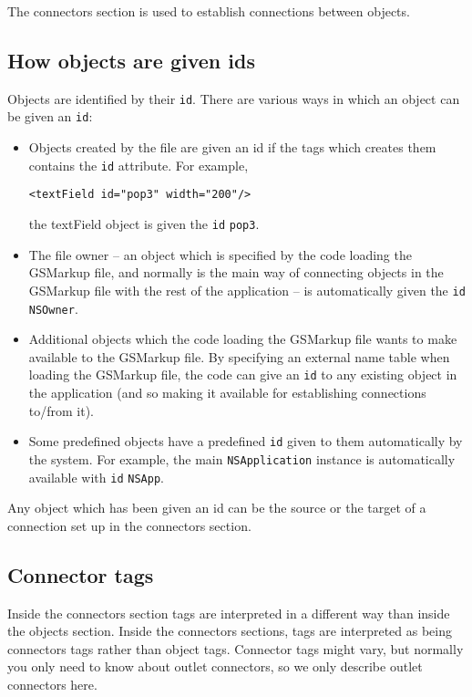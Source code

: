 The connectors section is used to establish connections between
objects.

\subsection{How objects are given ids}
Objects are identified by their \texttt{id}.  There are various ways
in which an object can be given an \texttt{id}:
\begin{itemize}
\item Objects created by the file are given an id if the tags which creates
them contains the \texttt{id} attribute.  For example,
\begin{verbatim}
<textField id="pop3" width="200"/>
\end{verbatim}
the textField object is given the \texttt{id} \texttt{pop3}.
\item The file owner -- an object which is specified by the code loading the
GSMarkup file, and normally is the main way of connecting objects in the
GSMarkup file with the rest of the application -- is automatically given
the \texttt{id} \texttt{NSOwner}.
\item Additional objects which the code loading the GSMarkup file wants to make
available to the GSMarkup file.  By specifying an external name table when
loading the GSMarkup file, the code can give an \texttt{id} to any
existing object in the application (and so making it available for
establishing connections to/from it).
\item Some predefined objects have a predefined \texttt{id} given to them
automatically by the system.  For example, the main
\texttt{NSApplication} instance is automatically available with \texttt{id}
\texttt{NSApp}.
\end{itemize}
Any object which has been given an id can be the source or the target
of a connection set up in the connectors section.

\subsection{Connector tags}
Inside the connectors section tags are interpreted in a different way
than inside the objects section.  Inside the connectors sections, tags
are interpreted as being connectors tags rather than object tags.
Connector tags might vary, but normally you only need to know about
outlet connectors, so we only describe outlet connectors here.


